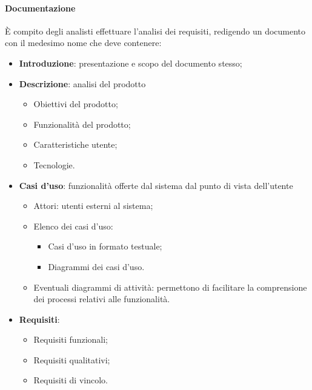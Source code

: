\paragraph{Documentazione}
È compito degli analisti effettuare l'analisi dei requisiti, redigendo un documento con il medesimo nome che deve contenere:
\begin{itemize}
    \item \textbf{Introduzione}: presentazione e scopo del documento stesso;
    \item \textbf{Descrizione}: analisi del prodotto
          \begin{itemize}
              \item Obiettivi del prodotto;
              \item Funzionalità del prodotto;
              \item Caratteristiche utente;
              \item Tecnologie.
          \end{itemize}
    \item \textbf{Casi d'uso}: funzionalità offerte dal sistema dal punto di vista dell'utente
        \begin{itemize}
            \item Attori: utenti esterni al sistema;
            \item Elenco dei casi d'uso:
            \begin{itemize}
                \item Casi d'uso in formato testuale;
                \item Diagrammi dei casi d'uso.
            \end{itemize}  
            \item Eventuali diagrammi di attività: permettono di facilitare la comprensione dei processi relativi alle funzionalità.
        \end{itemize}
    \item \textbf{Requisiti}:
        \begin{itemize}
            \item Requisiti funzionali;
            \item Requisiti qualitativi;
            \item Requisiti di vincolo.
        \end{itemize}
\end{itemize}
